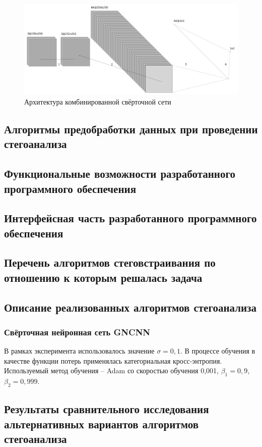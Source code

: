 \begin{figure}[!htb]
\centering
\includegraphics[width=1\textwidth]{include/graphics/mixed_color_architecture}
\caption{Архитектура комбинированной свёрточной сети}
\label{fig:FrenchCNNArchitecture}
\end{figure}
\subsection{Алгоритмы предобработки данных при проведении стегоанализа}

\subsection{Функциональные возможности разработанного программного обеспечения}
\subsection{Интерфейсная часть разработанного программного обеспечения}
\subsection{Перечень алгоритмов стеговстраивания по отношению к которым решалась задача}
\subsection{Описание реализованных алгоритмов стегоанализа}
\subsubsection{Свёрточная нейронная сеть GNCNN}
 В рамках эксперимента использовалось значение $ \sigma = 0,1 $.
 В процессе обучения в качестве функции потерь применялась категориальная кросс-энтропия. Используемый метод обучения – Adam со скоростью обучения 0,001, $ \beta_1 = 0,9 $, $ \beta_2 = 0,999 $. 
\subsection{Результаты сравнительного исследования альтернативных вариантов алгоритмов стегоанализа}


